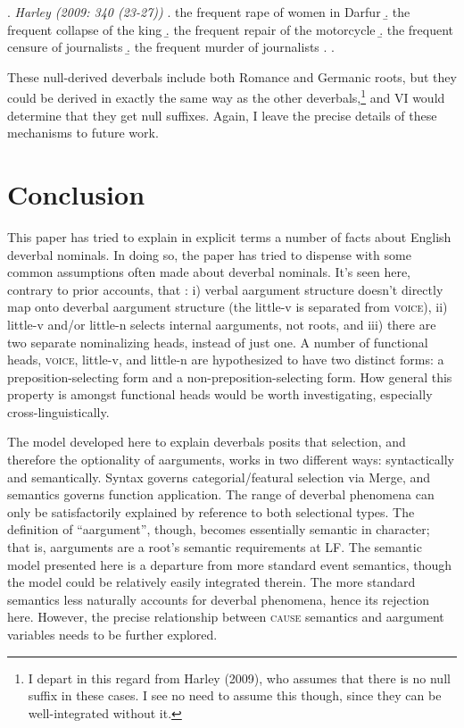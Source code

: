 \documentclass[12pt]{article}
\begin{document}
\singlespacing

\ex. \textit{Harley (2009: 340 (23-27))}
\a. the frequent rape of women in Darfur
\b. the frequent collapse of the king
\b. the frequent repair of the motorcycle
\b. the frequent censure of journalists
\b. the frequent murder of journalists
\z. \z. \par

\doublespacing

These null-derived deverbals include both Romance and Germanic roots, but they could be derived in exactly the same way as the other deverbals,\footnote{ I depart in this regard from Harley (2009), who assumes that there is no null suffix in these cases. I see no need to assume this though, since they can be well-integrated without it.} and VI would determine that they get null suffixes. Again, I leave the precise details of these mechanisms to future work.

\section{Conclusion}\label{conc}

This paper has tried to explain in explicit terms a number of facts about English deverbal nominals. In doing so, the paper has tried to dispense with some common assumptions often made about deverbal nominals. It's seen here, contrary to prior accounts, that : i) verbal aargument structure doesn't directly map onto deverbal aargument structure (the little-v is separated from \textsc{voice}), ii) little-v and/or little-n selects internal aarguments, not roots, and iii) there are two separate nominalizing heads, instead of just one. A number of functional heads, \textsc{voice}, little-v, and little-n are hypothesized to have two distinct forms: a preposition-selecting form and a non-preposition-selecting form. How general this property is amongst functional heads would be worth investigating, especially cross-linguistically.

The model developed here to explain deverbals posits that selection, and therefore the optionality of aarguments, works in two different ways: syntactically and semantically. Syntax governs categorial/featural selection via Merge, and semantics governs function application. The range of deverbal phenomena can only be satisfactorily explained by reference to both selectional types. The definition of ``aargument'', though, becomes essentially semantic in character; that is, aarguments are a root's semantic requirements at LF. The semantic model presented here is a departure from more standard event semantics, though the model could be relatively easily integrated therein. The more standard semantics less naturally accounts for deverbal phenomena, hence its rejection here. However, the precise relationship between \textsc{cause} semantics and aargument variables needs to be further explored.
\end{document}
